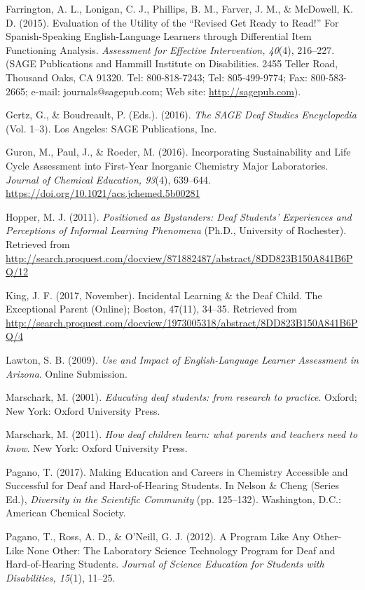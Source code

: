 \documentclass[11.5pt]{sig-alternate} %
\begin{document}
Farrington, A. L., Lonigan, C. J., Phillips, B. M., Farver, J. M., \& McDowell, K. D. (2015). Evaluation of the Utility of the “Revised Get Ready to Read!” For Spanish-Speaking English-Language Learners through Differential Item Functioning Analysis. \textit{Assessment for Effective Intervention, 40}(4), 216–227. (SAGE Publications and Hammill Institute on Disabilities. 2455 Teller Road, Thousand Oaks, CA 91320. Tel: 800-818-7243; Tel: 805-499-9774; Fax: 800-583-2665; e-mail: journals@sagepub.com; Web site: \url{http://sagepub.com}).

Gertz, G., \& Boudreault, P. (Eds.). (2016). \textit{The SAGE Deaf Studies Encyclopedia} (Vol. 1–3). Los Angeles: SAGE Publications, Inc.

Guron, M., Paul, J., \& Roeder, M. (2016). Incorporating Sustainability and Life Cycle Assessment into First-Year Inorganic Chemistry Major Laboratories. \textit{Journal of Chemical Education, 93}(4), 639–644. \url{https://doi.org/10.1021/acs.jchemed.5b00281}

Hopper, M. J. (2011). \textit{Positioned as Bystanders: Deaf Students’ Experiences and Perceptions of Informal Learning Phenomena} (Ph.D., University of Rochester). Retrieved from \url{http://search.proquest.com/docview/871882487/abstract/8DD823B150A841B6PQ/12}

King, J. F. (2017, November). Incidental Learning \& the Deaf Child. The Exceptional Parent (Online); Boston, 47(11), 34–35. Retrieved from \url{http://search.proquest.com/docview/1973005318/abstract/8DD823B150A841B6PQ/4}

Lawton, S. B. (2009). \textit{Use and Impact of English-Language Learner Assessment in Arizona}. Online Submission.

Marschark, M. (2001). \textit{Educating deaf students: from research to practice}. Oxford; New York: Oxford University Press.

Marschark, M. (2011). \textit{How deaf children learn: what parents and teachers need to know}. New York: Oxford University Press.

Pagano, T. (2017). Making Education and Careers in Chemistry Accessible and Successful for Deaf and Hard-of-Hearing Students. In Nelson \& Cheng (Series Ed.), \textit{Diversity in the Scientific Community} (pp. 125–132). Washington, D.C.: American Chemical Society.

Pagano, T., Ross, A. D., \& O’Neill, G. J. (2012). A Program Like Any Other-Like None Other: The Laboratory Science Technology Program for Deaf and Hard-of-Hearing Students. \textit{Journal of Science Education for Students with Disabilities, 15}(1), 11–25.
\end{document}
